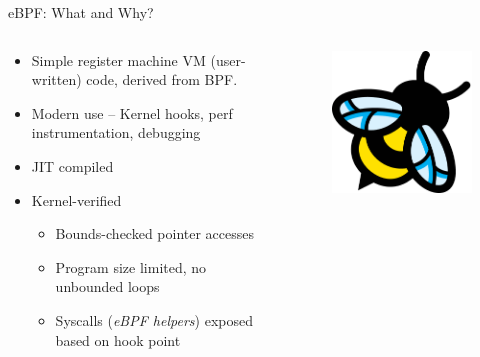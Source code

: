 \documentclass[aspectratio=169,xcolor={dvipsnames}
]{beamer}
\begin{document}
\begin{frame}{eBPF: What and Why?}
	\begin{columns}
		\begin{column}{0.6\linewidth}
			\begin{itemize}
				\item Simple register machine VM (user-written) code, derived from BPF.
				\item Modern use -- Kernel hooks, perf instrumentation, debugging
				\item JIT compiled
				\item Kernel-verified
				\begin{itemize}
					\item Bounds-checked pointer accesses
					\item Program size limited, no unbounded loops
					\item Syscalls (\emph{eBPF helpers}) exposed based on hook point
				\end{itemize}
			\end{itemize}
		\end{column}
		\begin{column}{0.4\linewidth}
			\begin{figure}
				\centering
				\includegraphics[width=0.9\linewidth,keepaspectratio]{images/ebpf}
			\end{figure}
		\end{column}
	\end{columns}
\end{frame}
\end{document}
